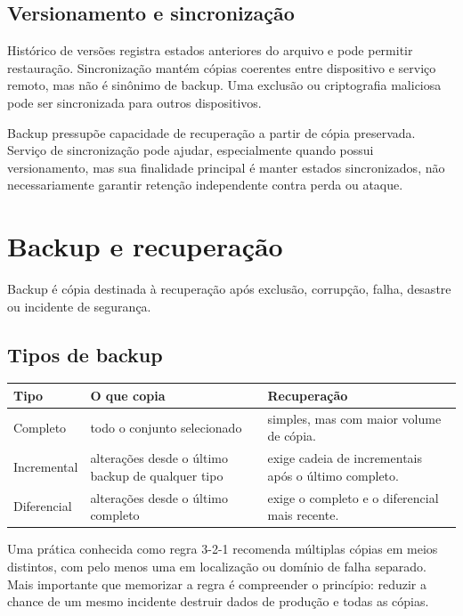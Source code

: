 \subsection{Versionamento e sincronização}

Histórico de versões registra estados anteriores do arquivo e pode permitir restauração. Sincronização mantém cópias coerentes entre dispositivo e serviço remoto, mas não é sinônimo de backup. Uma exclusão ou criptografia maliciosa pode ser sincronizada para outros dispositivos.

\begin{atencao}
Backup pressupõe capacidade de recuperação a partir de cópia preservada. Serviço de sincronização pode ajudar, especialmente quando possui versionamento, mas sua finalidade principal é manter estados sincronizados, não necessariamente garantir retenção independente contra perda ou ataque.
\end{atencao}

\section{Backup e recuperação}

Backup é cópia destinada à recuperação após exclusão, corrupção, falha, desastre ou incidente de segurança.

\subsection{Tipos de backup}

\begin{table}[ht]
\centering
\small
\begin{tabularx}{\textwidth}{l X X}
\toprule
Tipo & O que copia & Recuperação \\
\midrule
Completo & todo o conjunto selecionado & simples, mas com maior volume de cópia. \\
Incremental & alterações desde o último backup de qualquer tipo & exige cadeia de incrementais após o último completo. \\
Diferencial & alterações desde o último completo & exige o completo e o diferencial mais recente. \\
\bottomrule
\end{tabularx}
\end{table}

Uma prática conhecida como regra 3-2-1 recomenda múltiplas cópias em meios distintos, com pelo menos uma em localização ou domínio de falha separado. Mais importante que memorizar a regra é compreender o princípio: reduzir a chance de um mesmo incidente destruir dados de produção e todas as cópias.

